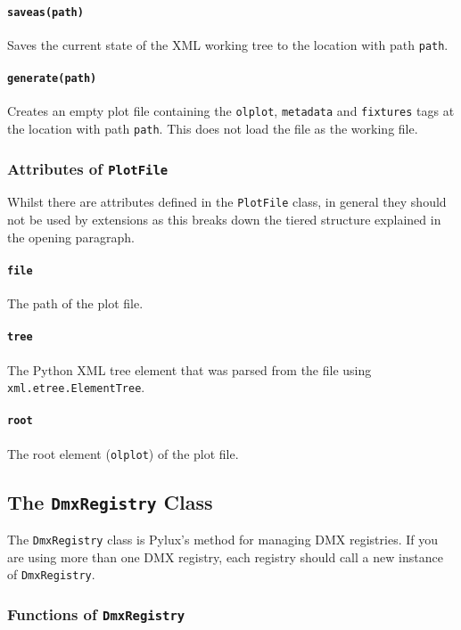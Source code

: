 \documentclass[a4paper]{article}
\begin{document}
\paragraph{\texttt{saveas(path)}}
Saves the current state of the XML working tree to the location with path 
\texttt{path}.

\paragraph{\texttt{generate(path)}}
Creates an empty plot file containing the \texttt{olplot}, \texttt{metadata} 
and \texttt{fixtures} tags at the location with path \texttt{path}. This does 
not load the file as the working file.

\subsubsection{Attributes of \texttt{PlotFile}}
Whilst there are attributes defined in the \texttt{PlotFile} class, in 
general they should not be used by extensions as this breaks down the 
tiered structure explained in the opening paragraph.

\paragraph{\texttt{file}}
The path of the plot file.

\paragraph{\texttt{tree}}
The Python XML tree element that was parsed from the file using 
\texttt{xml.etree.ElementTree}.

\paragraph{\texttt{root}}
The root element (\texttt{olplot}) of the plot file.

\subsection{The \texttt{DmxRegistry} Class}
The \texttt{DmxRegistry} class is Pylux's method for managing DMX registries. 
If you are using more than one DMX registry, each registry should call a new 
instance of \texttt{DmxRegistry}.

\subsubsection{Functions of \texttt{DmxRegistry}}
\end{document}
